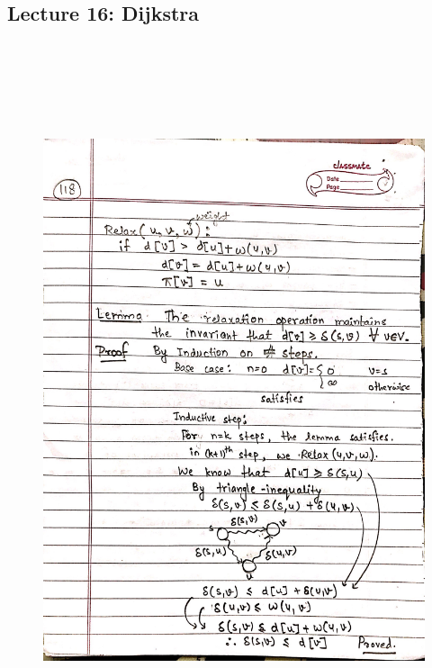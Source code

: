 \newpage
{\color{black} \subsection*{Lecture 16: Dijkstra}}
\begin{figure}[H]
    \centering
    \includegraphics[width=16cm, height=21cm]{"./MIT-6.006/MIT-6006-118"}
\end{figure}


